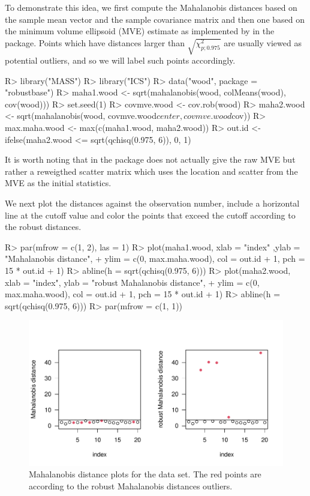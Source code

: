 \documentclass[article,nojss]{jss}
\begin{document}
To demonstrate this idea, we first compute the Mahalanobis distances based on the sample mean vector and the sample covariance
matrix and then one based on the minimum volume ellipsoid ({MVE}) estimate as implemented by  in
the  package. Points which have distances larger than $\sqrt{\chi^2_{p;0.975}}$ are usually viewed as potential outliers,
and so we will label such points accordingly.
\begin{Schunk}
\begin{Sinput}
R> library("MASS")
R> library("ICS")
R> data("wood", package = "robustbase")
R> maha1.wood <- sqrt(mahalanobis(wood, colMeans(wood), cov(wood)))
R> set.seed(1)
R> covmve.wood <- cov.rob(wood)
R> maha2.wood <- sqrt(mahalanobis(wood, covmve.wood$center, covmve.wood$cov))
R> max.maha.wood <- max(c(maha1.wood, maha2.wood))
R> out.id <- ifelse(maha2.wood <= sqrt(qchisq(0.975, 6)), 0, 1)
\end{Sinput}
\end{Schunk}
It is worth noting that  in the  package does not actually give the raw {MVE}
but rather a reweigthed scatter matrix which uses the location and scatter from the {MVE} as the initial statistics.

We next plot the distances against the observation number, include a horizontal line at the cutoff value and color the points that exceed the cutoff according to the robust distances.
\begin{Schunk}
\begin{Sinput}
R> par(mfrow = c(1, 2), las = 1)
R> plot(maha1.wood, xlab = "index" ,ylab = "Mahalanobis distance", 
+    ylim = c(0, max.maha.wood), col = out.id + 1, pch = 15 * out.id + 1)
R> abline(h = sqrt(qchisq(0.975, 6)))
R> plot(maha2.wood, xlab = "index", ylab = "robust Mahalanobis distance", 
+    ylim = c(0, max.maha.wood), col = out.id + 1, pch = 15 * out.id + 1)
R> abline(h = sqrt(qchisq(0.975, 6)))
R> par(mfrow = c(1, 1))
\end{Sinput}
\end{Schunk}

\begin{figure}[t]
\begin{center}
\includegraphics{ICS-009}
\caption{Mahalanobis distance plots for the  data set. The red points are according to the robust Mahalanobis distances outliers.}
\label{Maha_wood}
\end{center}
\end{figure}
\end{document}

